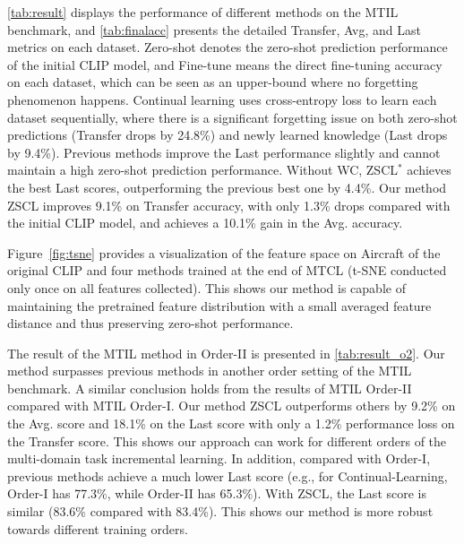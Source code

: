 \cref{tab:result} displays the performance of different methods on the MTIL benchmark, and \cref{tab:finalacc} presents the detailed Transfer, Avg, and Last metrics on each dataset. Zero-shot denotes the zero-shot prediction performance of the initial CLIP model, and Fine-tune means the direct fine-tuning accuracy on each dataset, which can be seen as an upper-bound where no forgetting phenomenon happens. Continual learning uses cross-entropy loss to learn each dataset sequentially, where there is a significant forgetting issue on both zero-shot predictions (Transfer drops by 24.8\%) and newly learned knowledge (Last drops by 9.4\%). Previous methods improve the Last performance slightly and cannot maintain a high zero-shot prediction performance. Without WC, ZSCL$^*$ achieves the best Last scores, outperforming the previous best one by 4.4\%. Our method ZSCL improves 9.1\% on Transfer accuracy, with only 1.3\% drops compared with the initial CLIP model, and achieves a 10.1\% gain in the Avg. accuracy.

Figure~\cref{fig:tsne} provides a visualization of the feature space on Aircraft of the original CLIP and four methods trained at the end of MTCL (t-SNE conducted only once on all features collected). This shows our method is capable of maintaining the pretrained feature distribution with a small averaged feature distance and thus preserving zero-shot performance.

The result of the MTIL method in Order-II is presented in \cref{tab:result_o2}. Our method surpasses previous methods in another order setting of the MTIL benchmark. A similar conclusion holds from the results of MTIL Order-II compared with MTIL Order-I. Our method ZSCL outperforms others by 9.2\% on the Avg. score and 18.1\% on the Last score with only a 1.2\% performance loss on the Transfer score. This shows our approach can work for different orders of the multi-domain task incremental learning. In addition, compared with Order-I, previous methods achieve a much lower Last score (e.g., for Continual-Learning, Order-I has 77.3\%, while Order-II has 65.3\%). With ZSCL, the Last score is similar (83.6\% compared with 83.4\%). This shows our method is more robust towards different training orders.


